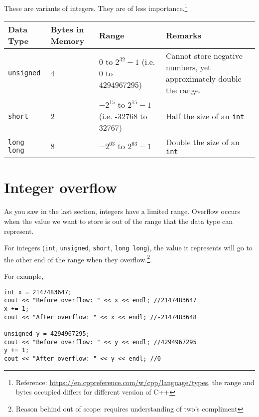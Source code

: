 \pagebreak

These are variants of integers. They are of less importance.\footnote{Reference: \href{https://en.cppreference.com/w/cpp/language/types}{https://en.cppreference.com/w/cpp/language/types}, the range and bytes occupied differs for different version of C++}

\begin{table}[h]
    \centering
    \begin{tabular}{|m{6em}|m{6em}|m{10em}|m{12em}|}
        \hline
        \textbf{Data Type} & 
        Bytes in Memory & 
        Range & 
        Remarks 
        \\ \hline \hline
        
        \texttt{unsigned} &
        4 & 
        $0$ to $2^{32}-1$ (i.e. 0 to 4294967295) &
        Cannot store negative numbers, yet approximately double the range.
        \\ \hline
        
        \texttt{short} &
        2 & 
        $-2^{15}$ to $2^{15}-1$ (i.e. -32768 to 32767) &
        Half the size of an \texttt{int}
        \\ \hline
        
        \texttt{long long} &
        8 & 
        $-2^{63}$ to $2^{63}-1$ &
        Double the size of an \texttt{int}
        \\ \hline
        
    \end{tabular}
\end{table}

\section{Integer overflow}

As you saw in the last section, integers have a limited range. Overflow occurs when the value we want to store is out of the range that the data type can represent. 

For integers (\texttt{int}, \texttt{unsigned}, \texttt{short}, \texttt{long long}), the value it represents will go to the other end of the range when they overflow.\footnote{Reason behind out of scope: requires understanding of two's compliment}. 

For example,
\begin{lstlisting}
int x = 2147483647;
cout << "Before overflow: " << x << endl; //2147483647
x += 1;
cout << "After overflow: " << x << endl; //-2147483648

unsigned y = 4294967295;
cout << "Before overflow: " << y << endl; //4294967295
y += 1;
cout << "After overflow: " << y << endl; //0
\end{lstlisting}

